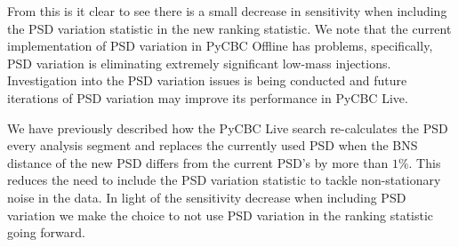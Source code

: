 %
From this is it clear to see there is a small decrease in sensitivity when including the PSD variation statistic in the new ranking statistic. We note that the current implementation of PSD variation in PyCBC Offline has problems, specifically, PSD variation is eliminating extremely significant low-mass injections. Investigation into the PSD variation issues is being conducted and future iterations of PSD variation may improve its performance in PyCBC Live.

We have previously described how the PyCBC Live search re-calculates the PSD every analysis segment and replaces the currently used PSD when the BNS distance of the new PSD differs from the current PSD's by more than $1\%$. This reduces the need to include the PSD variation statistic to tackle non-stationary noise in the data. In light of the sensitivity decrease when including PSD variation we make the choice to not use PSD variation in the ranking statistic going forward.

